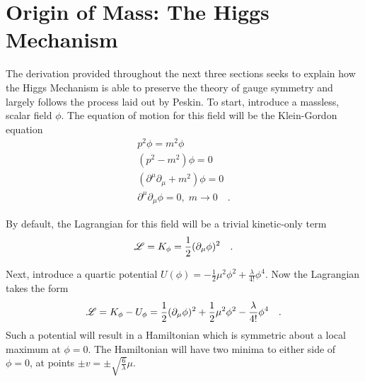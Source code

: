 \section{Origin of Mass: The Higgs Mechanism}\label{sec:higgs_mechanism}

    The derivation provided throughout the next three sections seeks to explain
        how the Higgs Mechanism is able to preserve the theory of gauge symmetry
        and largely follows the process laid out by Peskin\cite{Peskin_book}.
    To start, introduce a massless, scalar field $\phi$.
    The equation of motion for this field will be the Klein-Gordon equation
    \begin{equation} \begin{split}
        p^2 \phi = m^2 \phi
        \\(p^2 - m^2) \phi = 0
        \\(\partial^\mu \partial_\mu + m^2) \phi = 0
        \\\partial^\mu \partial_\mu \phi = 0,\; m\to0
        \quad.
    \end{split} \end{equation}

    By default, the Lagrangian for this field will be a trivial kinetic-only term
    \begin{equation}
        \mathscr{L} = K_{\phi} = \frac{1}{2} (\partial_{\mu} \phi)^2
        \quad.
    \end{equation}
    
    Next, introduce a quartic potential $U(\phi) = -\frac{1}{2} \mu^2 \phi^2 + \frac{\lambda}{4!} \phi^4$.
    Now the Lagrangian takes the form
    \begin{equation}
        \mathscr{L} = K_{\phi} - U_{\phi} = \frac{1}{2} (\partial_{\mu} \phi)^2 
            +\frac{1}{2} \mu^2 \phi^2 - \frac{\lambda}{4!} \phi^4
        \quad.
    \end{equation}
    Such a potential will result in a Hamiltonian which is symmetric about a local maximum at $\phi=0$.
    The Hamiltonian will have two minima to either side of $\phi=0$, at points $\pm v = \pm \sqrt{\frac{6}{\lambda}} \mu$.

